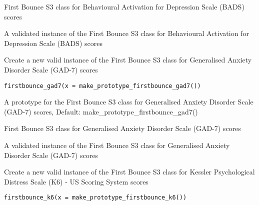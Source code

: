 \documentclass[a4paper]{book}
\begin{document}
%
\begin{Details}\relax
First Bounce S3 class for Behavioural Activation for Depression Scale (BADS) scores
\end{Details}
%
\begin{Value}
A validated instance of the First Bounce S3 class for Behavioural Activation for Depression Scale (BADS) scores
\end{Value}
%
\begin{Description}\relax
Create a new valid instance of the First Bounce S3 class for Generalised Anxiety Disorder Scale (GAD-7) scores
\end{Description}
%
\begin{Usage}
\begin{verbatim}
firstbounce_gad7(x = make_prototype_firstbounce_gad7())
\end{verbatim}
\end{Usage}
%
\begin{Arguments}
\begin{ldescription}
\item[\code{x}] A prototype for the First Bounce S3 class for Generalised Anxiety Disorder Scale (GAD-7) scores, Default: make\_prototype\_firstbounce\_gad7()
\end{ldescription}
\end{Arguments}
%
\begin{Details}\relax
First Bounce S3 class for Generalised Anxiety Disorder Scale (GAD-7) scores
\end{Details}
%
\begin{Value}
A validated instance of the First Bounce S3 class for Generalised Anxiety Disorder Scale (GAD-7) scores
\end{Value}
%
\begin{Description}\relax
Create a new valid instance of the First Bounce S3 class for Kessler Psychological Distress Scale (K6) - US Scoring System scores
\end{Description}
%
\begin{Usage}
\begin{verbatim}
firstbounce_k6(x = make_prototype_firstbounce_k6())
\end{verbatim}
\end{Usage}
\end{document}
